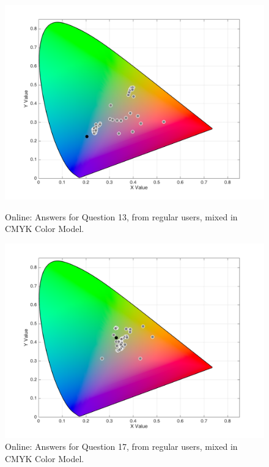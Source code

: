 \begin{figure}[!htbp]
  \centering
  \vspace{-5pt}
  \begin{minipage}{0.48\textwidth}
    \centering
    \includegraphics[width=\textwidth]{images/results/13_online_CMYKresponses.png}
    \caption[Online: Answers for Question 13, from regular users, mixed in CMYK Color Model.]{Online: Answers for Question 13, from regular users, mixed in CMYK Color Model.}
    \label{fig:onlinecmykregular_13}
  \end{minipage}\hfill
  \begin{minipage}{0.48\textwidth}
    \centering
    \includegraphics[width=\textwidth]{images/results/17_online_CMYKresponses.png}
    \caption[Online: Answers for Question 17, from regular users, mixed in CMYK Color Model.]{Online: Answers for Question 17, from regular users, mixed in CMYK Color Model.}
    \label{fig:onlinecmykregular_17}
  \end{minipage}
  \vspace{-5pt}
\end{figure}
